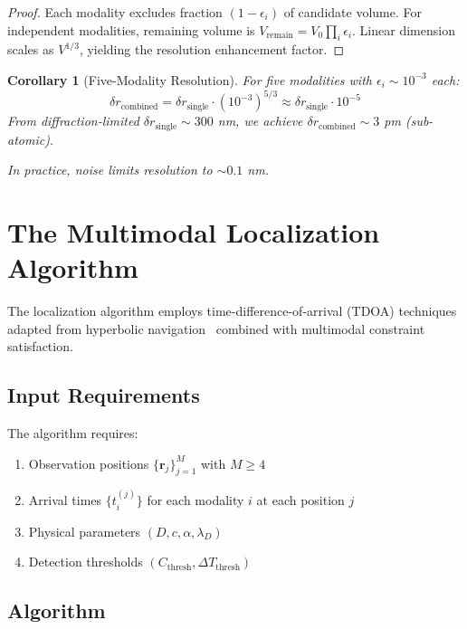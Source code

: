 \documentclass[11pt,a4paper]{article}
\newtheorem{corollary}[theorem]{Corollary}
\theoremstyle{remark}
\newcommand{\obspos}{\mathbf{r}}
\begin{document}
\begin{proof}
Each modality excludes fraction $(1-\epsilon_i)$ of candidate volume. For independent modalities, remaining volume is $V_{\text{remain}} = V_0 \prod_i \epsilon_i$. Linear dimension scales as $V^{1/3}$, yielding the resolution enhancement factor.
\end{proof}

\begin{corollary}[Five-Modality Resolution]
For five modalities with $\epsilon_i \sim 10^{-3}$ each:
\begin{equation}
    \delta r_{\text{combined}} = \delta r_{\text{single}} \cdot (10^{-3})^{5/3} \approx \delta r_{\text{single}} \cdot 10^{-5}
\end{equation}
From diffraction-limited $\delta r_{\text{single}} \sim 300$ nm, we achieve $\delta r_{\text{combined}} \sim 3$ pm (sub-atomic).

In practice, noise limits resolution to $\sim 0.1$ nm.
\end{corollary}

\section{The Multimodal Localization Algorithm}
\label{sec:algorithm}

The localization algorithm employs time-difference-of-arrival (TDOA) techniques adapted from hyperbolic navigation~\citep{fang2008simple,chan1994simple} combined with multimodal constraint satisfaction.

\subsection{Input Requirements}

The algorithm requires:
\begin{enumerate}
    \item Observation positions $\{\obspos_j\}_{j=1}^M$ with $M \geq 4$
    \item Arrival times $\{t_i^{(j)}\}$ for each modality $i$ at each position $j$
    \item Physical parameters $(D, c, \alpha, \lambda_D)$
    \item Detection thresholds $(C_{\text{thresh}}, \Delta T_{\text{thresh}})$
\end{enumerate}

\subsection{Algorithm}
\end{document}
